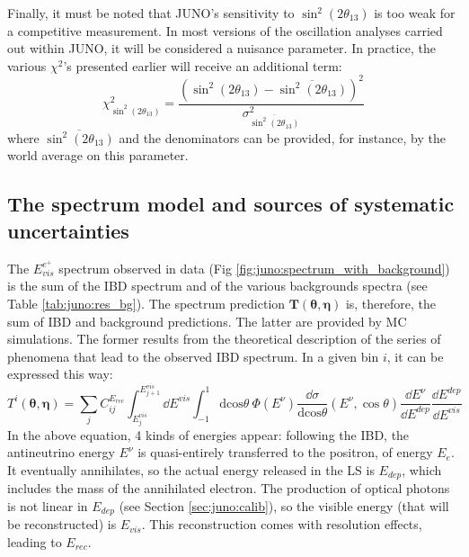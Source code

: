 \documentclass[../main.tex]{subfiles}
\begin{document}
Finally, it must be noted that JUNO's sensitivity to $\sin^2(2\theta_{13})$ is too weak for a competitive measurement. In most versions of the oscillation analyses carried out within JUNO, it will be considered a nuisance parameter. In practice, the various $\chi^2$'s presented earlier will receive an additional term:
\begin{equation}
  \chi^2_{\sin^2(2\theta_{13})} = \frac{(\sin^2(2\theta_{13})-\overline{\sin^2(2\theta_{13})})^2}{\sigma^2_{\overline{\sin^2(2\theta_{13})}}}
\end{equation}
where $\overline{\sin^2(2\theta_{13})}$ and the denominators can be provided, for instance, by the world average on this parameter.

\subsection{The spectrum model and sources of systematic uncertainties}

The $E^{e^+}_{vis}$ spectrum observed in data (Fig \ref{fig:juno:spectrum_with_background}) is the sum of the IBD spectrum and of the various backgrounds spectra (see Table \ref{tab:juno:res_bg}).
The spectrum prediction $\bm{T}\left(\bm{\theta},\bm{\eta}\right)$ is, therefore, the sum of IBD and background predictions. The latter are provided by MC simulations. The former results from the theoretical description of the series of phenomena that lead to the observed IBD spectrum. In a given bin $i$, it can be expressed this way:
\begin{equation}
  \label{eq:juno:bin_content}
  T^i(\bm{\theta},\bm{\eta}) =\sum_{j} C_{ij}^{E_{rec}} \int_{E^{vis}_{j}}^{E^{vis}_{j+1}} \dd E^{vis} \int_{-1}^{1} \mathrm{dcos}\theta ~ \Phi(E^{\nu}) \frac{\dd\sigma}{\mathrm{dcos}\theta}(E^{\nu}, \cos\theta) \frac{\dd E^{\nu}}{\dd E^{dep}} \frac{\dd E^{dep}}{\dd E^{vis}}
\end{equation}
In the above equation, 4 kinds of energies appear: following the IBD, the antineutrino energy $E^{\nu}$ is quasi-entirely transferred to the positron, of energy $E_{e}$. It eventually annihilates, so the actual energy released in the LS is $E_{dep}$, which includes the mass of the annihilated electron. The production of optical photons is not linear in $E_{dep}$ (see Section \ref{sec:juno:calib}), so the visible energy (that will be reconstructed) is $E_{vis}$. This reconstruction comes with resolution effects, leading to $E_{rec}$.
\end{document}
